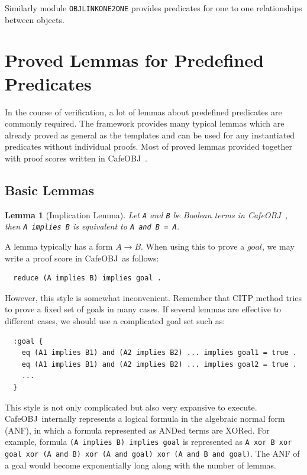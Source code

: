 \documentclass[12pt]{report}
\newtheorem{lemma}{Lemma}
\newcommand{\ra}{\rightarrow}
\newcommand{\stt}[1]{{\small{\tt {#1}}}}
\newcommand{\cafeobj}{{\sf CafeOBJ}~}
\begin{document}
Similarly module {\tt OBJLINKONE2ONE} provides predicates for one to
one relationships between objects.

\section{Proved Lemmas for Predefined Predicates}
\label{sec:lemma}
In the course of verification, a lot of lemmas about predefined
predicates are commonly required.  The framework provides many 
typical lemmas which are already proved as general as the templates
and can be used for any instantiated predicates without individual
proofs. Most of proved lemmas provided together with proof scores
written in \cafeobj.
\subsection{Basic Lemmas}
\label{sec:baselemma}
\begin{lemma}[Implication Lemma]
  Let {\tt A} and {\tt B} be Boolean terms in \cafeobj, then \stt{A
    implies B} is equivalent to \stt{A and B = A}.
\end{lemma}
A lemma typically has a form $A \ra B$. When using this to prove
a $goal$, we may write a proof score in \cafeobj as follows:
\begin{verbatim}
  reduce (A implies B) implies goal .
\end{verbatim}
However, this style is somewhat inconvenient. Remember that CITP
method tries to prove a fixed set of goals in many cases. If several lemmas are
effective to different cases, we should use a complicated goal set such as:
\begin{verbatim}
  :goal {
    eq (A1 implies B1) and (A2 implies B2) ... implies goal1 = true .
    eq (A1 implies B1) and (A2 implies B2) ... implies goal2 = true .
    ...
  }
\end{verbatim}
This style is not only complicated but also very expansive to execute.
\cafeobj internally represents a logical formula in the algebraic
normal form (ANF), in which a formula represented as ANDed terms are
XORed. For example, formula \stt{(A implies B) implies goal} is
represented as \stt{A xor B xor goal xor (A and B) xor (A and goal)
  xor (A and B and goal)}. The ANF of a goal would become
exponentially long along with the number of lemmas.
\end{document}
